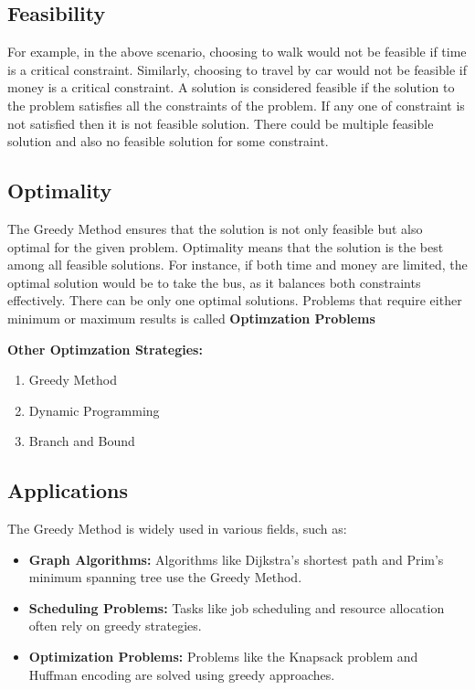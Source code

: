 \documentclass[11pt, a4paper]{article}
\begin{document}
\subsection{Feasibility}
For example, in the above scenario, choosing to walk would not be feasible if time is a critical constraint. Similarly, choosing to travel by car would not be feasible if money is a critical constraint. A solution is considered feasible if the solution to the problem satisfies all the constraints of the problem. If any one of constraint is not satisfied then it is not feasible solution. There could be multiple feasible solution and also no feasible solution for some constraint. 

\subsection{Optimality}
The Greedy Method ensures that the solution is not only feasible but also optimal for the given problem. Optimality means that the solution is the best among all feasible solutions. For instance, if both time and money are limited, the optimal solution would be to take the bus, as it balances both constraints effectively. There can be only one optimal solutions. 
Problems that require either minimum or maximum results is called \textbf{Optimzation Problems}

\textbf{Other Optimzation Strategies:}
\begin{enumerate}
    \item Greedy Method
    \item Dynamic Programming
    \item Branch and Bound
\end{enumerate}

\subsection{Applications}
The Greedy Method is widely used in various fields, such as:
\begin{itemize}
    \item \textbf{Graph Algorithms:} Algorithms like Dijkstra's shortest path and Prim's minimum spanning tree use the Greedy Method.
    \item \textbf{Scheduling Problems:} Tasks like job scheduling and resource allocation often rely on greedy strategies.
    \item \textbf{Optimization Problems:} Problems like the Knapsack problem and Huffman encoding are solved using greedy approaches.
\end{itemize}
\end{document}
